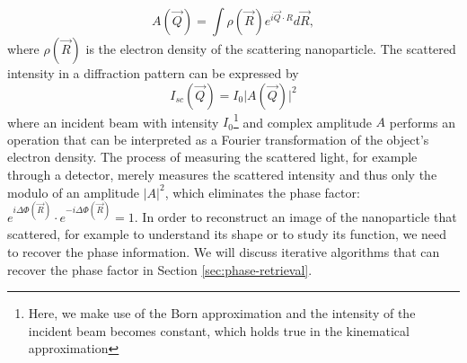 \begin{equation}
A(\vec{Q})=\int \rho\left(\vec{R}\right) e^{i \vec{Q}\cdot R}d\vec{R},
\label{eq:scattered-amplitude}
\end{equation}
where $\rho\left(\vec{R}\right)$ is the electron density of the scattering nanoparticle. The scattered intensity in a diffraction pattern can be expressed by
\begin{equation}
I_{sc}\left(\vec{Q}\right)=I_{0}\lvert A(\vec{Q})\rvert^{2}
\label{eq:scattered-intensity}
\end{equation}
where an incident beam with intensity $I_{0}$\footnote{Here, we make use of the Born approximation and the intensity of the incident beam becomes constant, which holds true in the kinematical approximation} and complex amplitude $A$ performs an operation that can be interpreted as a Fourier transformation of the object's electron density. The process of measuring the scattered light, for example through a detector, merely measures the scattered intensity and thus only the modulo of an amplitude $\lvert A\rvert^{2}$, which eliminates the phase factor: $e^{i\Delta\Phi\left(\vec{R}\right)}\cdot e^{-i\Delta\Phi\left(\vec{R}\right)}=1$. In order to reconstruct an image of the nanoparticle that scattered, for example to understand its shape or to study its function, we need to recover the phase information. We will discuss iterative algorithms that can recover the phase factor in Section \ref{sec:phase-retrieval}.\\[1\baselineskip]
